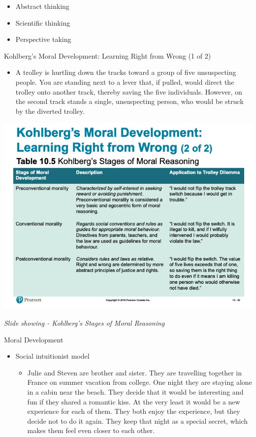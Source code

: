 \documentclass[
]{book}
\providecommand{\tightlist}{%
  \setlength{\itemsep}{0pt}\setlength{\parskip}{0pt}}
\begin{document}
\begin{reflect}
\begin{itemize}
  \begin{itemize}
  \tightlist
  \item
    Abstract thinking\\
  \item
    Scientific thinking\\
  \item
    Perspective taking
  \end{itemize}
\end{itemize}

Kohlberg's Moral Development: Learning Right from Wrong (1 of 2)

\begin{itemize}
\tightlist
\item
  A trolley is hurtling down the tracks toward a group of five unsuspecting people. You are standing next to a lever that, if pulled, would direct the trolley onto another track, thereby saving the five individuals. However, on the second track stands a single, unsuspecting person, who would be struck by the diverted trolley.
\end{itemize}

\includegraphics{assets/unit_3/slide_50.png}

\emph{Slide showing - Kohlberg's Stages of Moral Reasoning}

Moral Development

\begin{itemize}
\tightlist
\item
  Social intuitionist model

  \begin{itemize}
  \tightlist
  \item
    Julie and Steven are brother and sister. They are travelling together in France on summer vacation from college. One night they are staying alone in a cabin near the beach. They decide that it would be interesting and fun if they shared a romantic kiss. At the very least it would be a new experience for each of them. They both enjoy the experience, but they decide not to do it again. They keep that night as a special secret, which makes them feel even closer to each other.
  \end{itemize}
\end{itemize}


\end{reflect}
\end{document}
